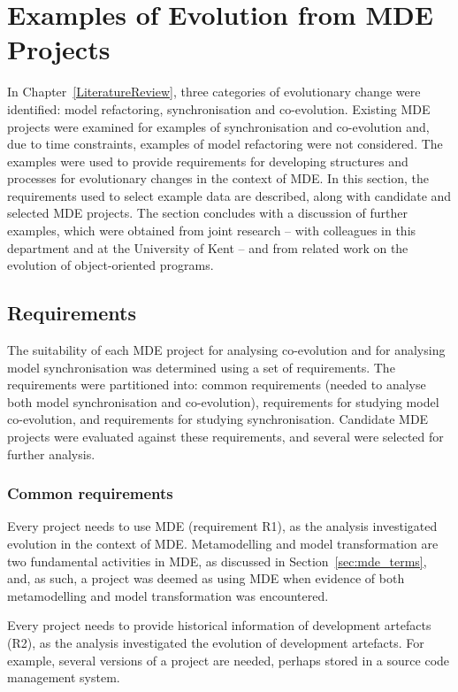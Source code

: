 \section{Examples of Evolution from MDE Projects}
\label{sec:locating_data}
In Chapter~\ref{LiteratureReview}, three categories of evolutionary change were identified: model refactoring, synchronisation and co-evolution. Existing MDE projects were examined for examples of synchronisation and co-evolution and, due to time constraints, examples of model refactoring were not considered. The examples were used to provide requirements for developing structures and processes for evolutionary changes in the context of MDE. In this section, the requirements used to select example data are described, along with candidate and selected MDE projects. The section concludes with a discussion of further examples, which were obtained from joint research -- with colleagues in this department and at the University of Kent -- and from related work on the evolution of object-oriented programs.  

\subsection{Requirements}
The suitability of each MDE project for analysing co-evolution and for analysing model synchronisation was determined using a set of requirements. The requirements were partitioned into: common requirements (needed to analyse both model synchronisation and co-evolution), requirements for studying model co-evolution, and requirements for studying synchronisation. Candidate MDE projects were evaluated against these requirements, and several were selected for further analysis.

\subsubsection{Common requirements}
Every project needs to use MDE (requirement R1), as the analysis investigated evolution in the context of MDE. Metamodelling and model transformation are two fundamental activities in MDE, as discussed in Section~\ref{sec:mde_terms}, and, as such, a project was deemed as using MDE when evidence of both metamodelling and model transformation was encountered.

Every project needs to provide historical information of development artefacts (R2), as the analysis investigated the evolution of development artefacts. For example, several versions of a project are needed, perhaps stored in a source code management system.

